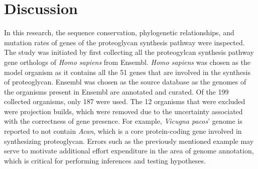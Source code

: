 \documentclass{article}
\begin{document}
\section{Discussion}
In this research, the sequence conservation, phylogenetic relationships, and mutation rates of genes of the proteoglycan synthesis pathway were inspected. The study was initiated by first collecting all the proteogylcan synthesis pathway gene orthologs of \textit{Homo sapiens} from Ensembl. \textit{Homo sapiens} was chosen as the model organism as it contains all the 51 genes that are involved in the synthesis of proteoglycan. Ensembl was chosen as the source database as the genomes of the organisms present in Ensembl are annotated and curated. Of the 199 collected organisms, only 187 were used. The 12 organisms that were excluded were projection builds, which were removed due to the uncertainty associated with the correctness of gene presence. For example, \textit{Vicugna pacos}' genome is reported to not contain \textit{Acan}, which is a core protein-coding gene involved in synthesizing proteoglycan. Errors such as the previously mentioned example may serve to motivate additional effort expenditure in the area of genome annotation, which is critical for performing inferences and testing hypotheses. 
\end{document}
